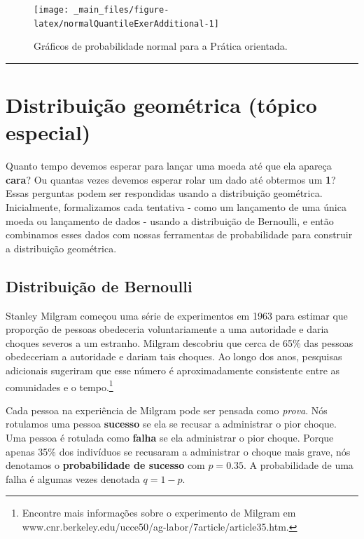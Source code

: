 \documentclass[
]{book}
\theoremstyle{definition}
\theoremstyle{definition}
\theoremstyle{definition}
\theoremstyle{definition}
\theoremstyle{remark}
\begin{document}
\begin{figure}

{\centering \texttt{[image: \_main\_files/figure-latex/normalQuantileExerAdditional-1]} 

}

\caption{Gráficos de probabilidade normal para a Prática orientada.}\label{fig:normalQuantileExerAdditional}
\end{figure}

\begin{center}\rule{0.5\linewidth}{0.5pt}\end{center}

\hypertarget{geometricDistribution}{%
\section{Distribuição geométrica (tópico especial)}\label{geometricDistribution}}

Quanto tempo devemos esperar para lançar uma moeda até que ela apareça \textbf{cara}? Ou quantas vezes devemos esperar rolar um dado até obtermos um \textbf{1}? Essas perguntas podem ser respondidas usando a distribuição geométrica. Inicialmente, formalizamos cada tentativa - como um lançamento de uma única moeda ou lançamento de dados - usando a distribuição de Bernoulli, e então combinamos esses dados com nossas ferramentas de probabilidade para construir a distribuição geométrica.

\hypertarget{bernoulliDistribution}{%
\subsection{Distribuição de Bernoulli}\label{bernoulliDistribution}}

Stanley Milgram começou uma série de experimentos em 1963 para estimar que proporção de pessoas obedeceria voluntariamente a uma autoridade e daria choques severos a um estranho. Milgram descobriu que cerca de 65\% das pessoas obedeceriam a autoridade e dariam tais choques. Ao longo dos anos, pesquisas adicionais sugeriram que esse número é aproximadamente consistente entre as comunidades e o tempo.\footnote{Encontre mais informações sobre o experimento de Milgram em www.cnr.berkeley.edu/ucce50/ag-labor/7article/article35.htm.}

Cada pessoa na experiência de Milgram pode ser pensada como \emph{prova}. Nós rotulamos uma pessoa \textbf{sucesso} se ela se recusar a administrar o pior choque. Uma pessoa é rotulada como \textbf{falha} se ela administrar o pior choque. Porque apenas 35\% dos indivíduos se recusaram a administrar o choque mais grave, nós denotamos o \textbf{probabilidade de sucesso} com \(p=0.35\). A probabilidade de uma falha é algumas vezes denotada \(q=1-p\).
\end{document}
